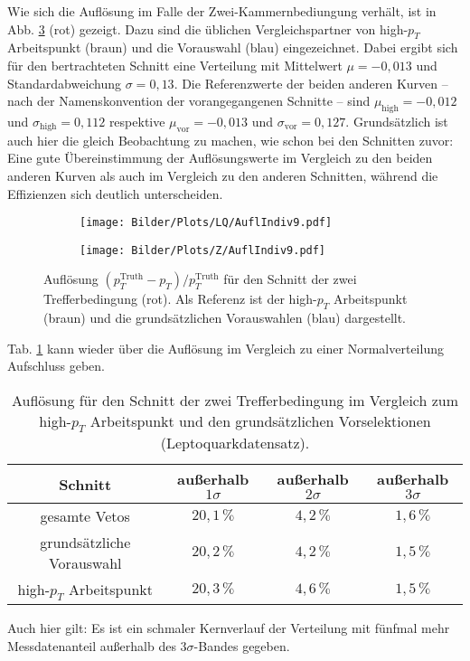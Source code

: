 Wie sich die Auflösung im Falle der Zwei-Kammernbediungung verhält, ist in Abb. \ref{AuflIndiv9} (rot) gezeigt. Dazu sind  die üblichen Vergleichspartner von high-$p_T$ Arbeitspunkt (braun) und die Vorauswahl (blau) eingezeichnet. Dabei ergibt sich für den bertrachteten Schnitt eine Verteilung mit Mittelwert $\mu=-0,013$ und Standardabweichung $\sigma=0,13$. Die Referenzwerte der beiden anderen Kurven -- nach der Namenskonvention der vorangegangenen Schnitte -- sind $\mu_{\text{high}}=-0,012$ und $\sigma_{\text{high}}=0,112$ respektive $\mu_{\text{vor}}=-0,013$ und $\sigma_{\text{vor}}=0,127$. Grundsätzlich ist auch hier die gleich Beobachtung zu machen, wie schon bei den Schnitten zuvor: Eine gute Übereinstimmung der Auflösungswerte im Vergleich zu den beiden anderen Kurven als auch im Vergleich zu den anderen Schnitten, während die Effizienzen sich deutlich unterscheiden.\\ 
\begin{figure}
  \begin{subfigure}[t]{0.55\textwidth}
  \texttt{[image: Bilder/Plots/LQ/AuflIndiv9.pdf]}
  \label{AuflIndiv9LQ}
  \end{subfigure}
\begin{subfigure}[t]{0.55\textwidth}
 \texttt{[image: Bilder/Plots/Z/AuflIndiv9.pdf]}
  \label{AuflIndiv9Z}
\end{subfigure}
\caption{Auflösung $(p_T^{\text{Truth}}-p_T)/p_T^{\text{Truth}}$ für den Schnitt der zwei Trefferbedingung (rot). Als Referenz ist der high-$p_T$ Arbeitspunkt (braun) und die grundsätzlichen Vorauswahlen (blau) dargestellt.}
\label{AuflIndiv9}
\end{figure} 
Tab. \ref{123sigmaIndiv9LQ} kann wieder über die Auflösung im Vergleich zu einer Normalverteilung Aufschluss geben. 
\begin{table}[htbp]
		\centering
		\begin{tabular*}{\linewidth}{@{\extracolsep{\fill}}cccc}
		\hline
		\hline
		\rule[-7pt]{0pt}{23pt} Schnitt & außerhalb $1\sigma$ & außerhalb $2\sigma$ & außerhalb $3\sigma$
		\\
		\hline
		\rule[-6pt]{0pt}{21pt} gesamte Vetos               & \(20,1\,\%\) & $4,2\,\%$ & $1,6\,\%$
		\\
		\rule[-6pt]{0pt}{21pt} grundsätzliche Vorauswahl   &  \(20,2\,\%\)	& $4,2\,\%$ & $1,5\,\%$
		\\
		\rule[-6pt]{0pt}{21pt} high-$p_T$ Arbeitspunkt     &  \(20,3\,\%\)	& $4,6\,\%$ & $1,5\,\%$
		\\
		\hline
		\hline
		\end{tabular*}
		\caption[Auflösung für den Schnitt der zwei Trefferbedingung den Leptoquarkdatensatz]{Auflösung für den Schnitt der zwei Trefferbedingung im Vergleich zum high-$p_T$ Arbeitspunkt und den grundsätzlichen Vorselektionen (Leptoquarkdatensatz).}
		\label{123sigmaIndiv9LQ}
	\end{table}
Auch hier gilt: Es ist ein schmaler Kernverlauf der Verteilung mit fünfmal mehr Messdatenanteil außerhalb des $3\sigma$-Bandes gegeben.
 
